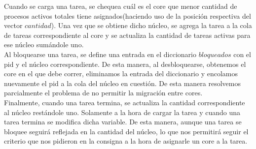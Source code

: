 \indent \indent Cuando se carga una tarea, se chequea cuál es el core que menor cantidad de procesos activos totales tiene asignados(haciendo uso de la posición respectiva del vector $cantidad$). Una vez que se obtiene dicho núcleo, se agrega la tarea a la cola de tareas correspondiente al core y se actualiza la cantidad de tareas activas para ese núcleo sumándole uno.\\
\indent \indent Al bloquearse una tarea, se define una entrada en el diccionario $bloqueados$ con el pid y el núcleo correspondiente. De esta manera, al desbloquearse, obtenemos el core en el que debe correr, eliminamos la entrada del diccionario y encolamos nuevamente el pid a la cola del núcleo en cuestión. De esta manera resolvemos parcialmente el problema de no permitir la migración entre cores.\\
\indent \indent Finalmente, cuando una tarea termina, se actualiza la cantidad correspondiente al núcleo restándole uno. Solamente a la hora de cargar la tarea y cuando una tarea termina se modifica dicha variable. De esta manera, aunque una tarea se bloquee seguirá reflejada en la cantidad del núcleo, lo que nos permitirá seguir el criterio que nos pidieron en la consigna a la hora de asignarle un core a la tarea.\\

